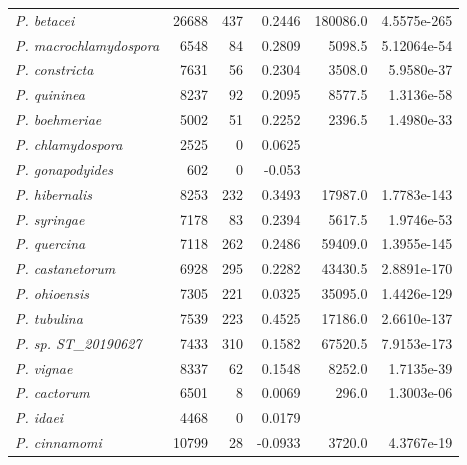 \begin{longtable}{@{}lrrrrr@{}}
  \textit{P. betacei}                 & 26688      & 437        & 0.2446       & 180086.0     & 4.5575e-265  \\
  \textit{P. macrochlamydospora}      & 6548       & 84         & 0.2809       & 5098.5       & 5.12064e-54   \\
  \textit{P. constricta}              & 7631       & 56         & 0.2304       & 3508.0       & 5.9580e-37  \\
  \textit{P. quininea}                & 8237       & 92         & 0.2095       & 8577.5       & 1.3136e-58  \\
  \textit{P. boehmeriae}              & 5002       & 51         & 0.2252       & 2396.5       & 1.4980e-33  \\
  \textit{P. chlamydospora}           & 2525       & 0          & 0.0625       &              &              \\
  \textit{P. gonapodyides}            & 602        & 0          & -0.053       &              &              \\
  \textit{P. hibernalis}              & 8253       & 232        & 0.3493       & 17987.0      & 1.7783e-143  \\
  \textit{P. syringae}                & 7178       & 83         & 0.2394       & 5617.5       & 1.9746e-53  \\
  \textit{P. quercina}                & 7118       & 262        & 0.2486       & 59409.0      & 1.3955e-145 \\
  \textit{P. castanetorum}            & 6928       & 295        & 0.2282       & 43430.5      & 2.8891e-170  \\
  \textit{P. ohioensis}               & 7305       & 221        & 0.0325       & 35095.0      & 1.4426e-129 \\
  \textit{P. tubulina}                & 7539       & 223        & 0.4525       & 17186.0      & 2.6610e-137  \\
  \textit{P. sp. ST\_20190627}        & 7433       & 310        & 0.1582       & 67520.5      & 7.9153e-173  \\
  \textit{P. vignae}                  & 8337       & 62         & 0.1548       & 8252.0       & 1.7135e-39  \\
  \textit{P. cactorum}                & 6501       & 8          & 0.0069       & 296.0        & 1.3003e-06  \\
  \textit{P. idaei}                   & 4468       & 0          & 0.0179       &              &                         \\
  \textit{P. cinnamomi}               & 10799      & 28         & -0.0933      & 3720.0       & 4.3767e-19  \\

\end{longtable}
